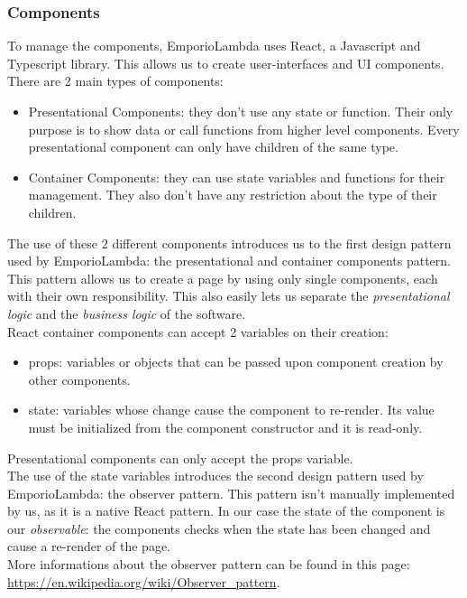 \subsubsection{Components}
To manage the components, EmporioLambda uses React, a Javascript and Typescript library. This allows us to create user-interfaces and UI components.
There are 2 main types of components:
\begin{itemize}
\item Presentational Components: they don't use any state or function. Their only purpose is to show data or call functions from higher level components. Every presentational component can only have children of the same type.
\item Container Components: they can use state variables and functions for their management. They also don't have any restriction about the type of their children.
\end{itemize}
The use of these 2 different components introduces us to the first design pattern used by EmporioLambda: the presentational and container components pattern. This pattern allows us to create a page by using only single components, each with their own responsibility. This also easily lets us separate the \textit{presentational logic} and the \textit{business logic} of the software.\\
React container components can accept 2 variables on their creation:
\begin{itemize}
\item props: variables or objects that can be passed upon component creation by other components.
\item state: variables whose change cause the component to re-render. Its value must be initialized from the component constructor and it is read-only.
\end{itemize}
Presentational components can only accept the props variable.\\
The use of the state variables introduces the second design pattern used by EmporioLambda: the observer pattern. This pattern isn't manually implemented by us, as it is a native React pattern. In our case the state of the component is our \textit{observable}: the components checks when the state has been changed and cause a re-render of the page.\\ More informations about the observer pattern can be found in this page: \url{https://en.wikipedia.org/wiki/Observer_pattern}.\\